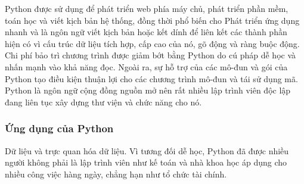 \documentclass[a4paper]{article}
\begin{document}
    \hspace*{0.5cm}\Large Python được sử dụng để phát triển web phía máy chủ, phát triển phần mềm, toán học và viết kịch bản hệ thống, đồng thời phổ biến cho Phát triển ứng dụng nhanh và là ngôn ngữ viết kịch bản hoặc kết dính để liên kết các thành phần hiện có vì cấu trúc dữ liệu tích hợp, cấp cao của nó, gõ động và ràng buộc động. Chi phí bảo trì chương trình được giảm bớt bằng Python do cú pháp dễ học và nhấn mạnh vào khả năng đọc. Ngoài ra, sự hỗ trợ của các mô-đun và gói của Python tạo điều kiện thuận lợi cho các chương trình mô-đun và tái sử dụng mã. Python là ngôn ngữ cộng đồng nguồn mở nên rất nhiều lập trình viên độc lập đang liên tục xây dựng thư viện và chức năng cho nó.
\subsubsection{Ứng dụng của Python}
\hspace*{0.5cm} Dữ liệu và trực quan hóa dữ liệu. Vì tương đối dễ học, Python đã được nhiều người không phải là lập trình viên như kế toán và nhà khoa học áp dụng cho nhiều công việc hàng ngày, chẳng hạn như tổ chức tài chính.
\end{document}
